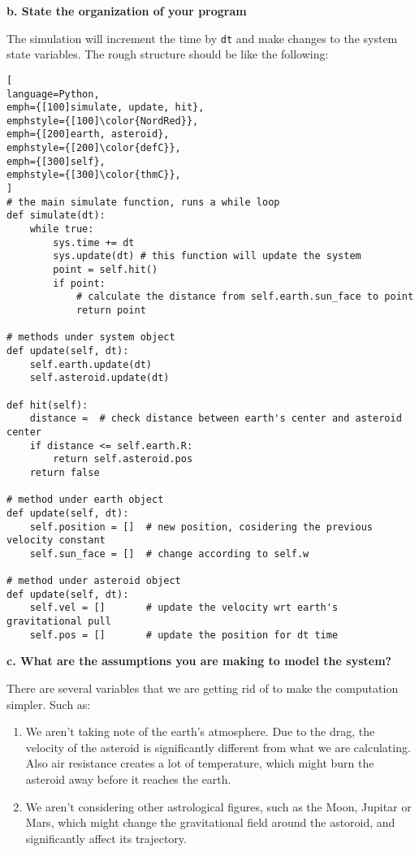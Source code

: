 \documentclass[article, 11pt, a4paper]{memoir}
\begin{document}
\textbf{b. State the organization of your program}
\vspace{1em}

\begin{solution}
    The simulation will increment the time by \texttt{dt} and make changes to the system
    state variables. The rough structure should be like the following:

\begin{lstlisting}[
language=Python,
emph={[100]simulate, update, hit},
emphstyle={[100]\color{NordRed}},
emph={[200]earth, asteroid},
emphstyle={[200]\color{defC}},
emph={[300]self},
emphstyle={[300]\color{thmC}},
]
# the main simulate function, runs a while loop
def simulate(dt):
    while true:
        sys.time += dt
        sys.update(dt) # this function will update the system
        point = self.hit()
        if point:
            # calculate the distance from self.earth.sun_face to point
            return point

# methods under system object
def update(self, dt):
    self.earth.update(dt)
    self.asteroid.update(dt)

def hit(self):
    distance =  # check distance between earth's center and asteroid center
    if distance <= self.earth.R:
        return self.asteroid.pos
    return false

# method under earth object
def update(self, dt):
    self.position = []  # new position, cosidering the previous velocity constant
    self.sun_face = []  # change according to self.w

# method under asteroid object
def update(self, dt):
    self.vel = []       # update the velocity wrt earth's gravitational pull
    self.pos = []       # update the position for dt time
\end{lstlisting}
\end{solution}

\textbf{c. What are the assumptions you are making to model the system?}
\vspace{1em}

\begin{solution}
    [c]
    There are several variables that we are getting rid of to make the computation
    simpler. Such as:
    \begin{enumerate}
        \item We aren't taking note of the earth's atmosphere. Due to the drag, the
            velocity of the asteroid is significantly different from what we are
            calculating. Also air resistance creates a lot of temperature, which might
            burn the asteroid away before it reaches the earth.
        \item We aren't considering other astrological figures, such as the Moon, Jupitar
            or Mars, which might change the gravitational field around the astoroid, and
            significantly affect its trajectory.
    \end{enumerate}
\end{solution}
\end{document}
